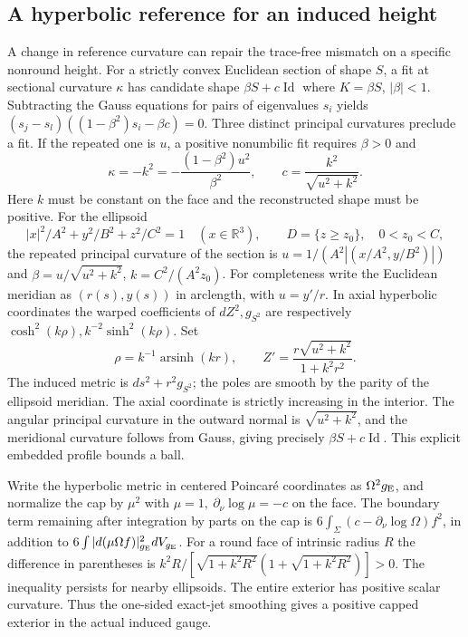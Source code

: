 \documentclass[11pt,letterpaper]{article}
\numberwithin{equation}{section}
\begin{document}
\subsection{A hyperbolic reference for an induced height}
A change in reference curvature can repair the trace-free mismatch
on a specific nonround height. For a strictly convex Euclidean
section of shape \(S\), a fit at sectional curvature \(\kappa\)
has candidate shape \(\beta S+c\operatorname{Id}\) where
\(K=\beta S\), \(|\beta|<1\). Subtracting the Gauss equations for
pairs of eigenvalues \(s_i\) yields
\((s_j-s_l)((1-\beta^2)s_i-\beta c)=0\).
Three distinct principal curvatures preclude a fit. If the repeated
one is \(u\), a positive nonumbilic fit requires \(\beta>0\) and
\[
 \kappa=-k^2=-\frac{(1-\beta^2)u^2}{\beta^2},\qquad
 c=\frac{k^2}{\sqrt{u^2+k^2}}.
\]
Here \(k\) must be constant on the face and the reconstructed shape
must be positive. For the ellipsoid
\[
 |x|^2/A^2+y^2/B^2+z^2/C^2=1\quad(x\in\mathbb R^3),
 \qquad D=\{z\ge z_0\},\quad 0<z_0<C,
\]
the repeated principal curvature of the section is
\(u=1/(A^2|(x/A^2,y/B^2)|)\) and
\(\beta=u/\sqrt{u^2+k^2}\), \(k=C^2/(A^2z_0)\).
For completeness write the Euclidean meridian as \((r(s),y(s))\)
in arclength, with \(u=y'/r\). In axial hyperbolic coordinates the
warped coefficients of \(dZ^2,g_{S^2}\) are respectively
\(\cosh^2(k\rho),k^{-2}\sinh^2(k\rho)\). Set
\[
 \rho=k^{-1}\operatorname{arsinh}(kr),\qquad
 Z'=\frac{r\sqrt{u^2+k^2}}{1+k^2r^2}.
\]
The induced metric is \(ds^2+r^2g_{S^2}\); the poles are smooth by
the parity of the ellipsoid meridian. The axial coordinate is strictly
increasing in the interior. The angular principal curvature in the
outward normal is \(\sqrt{u^2+k^2}\), and the meridional curvature
follows from Gauss, giving precisely \(\beta S+c\operatorname{Id}\).
This explicit embedded profile bounds a ball.

Write the hyperbolic metric in centered Poincar\'e coordinates as
\(\Omega^2g_{\rm E}\), and normalize the cap by \(\mu^2\) with
\(\mu=1,\ \partial_\nu\log\mu=-c\) on the face. The boundary
term remaining after integration by parts on the cap is
\(6\int_\Sigma(c-\partial_\nu\log\Omega)f^2\), in addition to
\(6\int |d(\mu\Omega f)|^2_{g_{\rm E}}dV_{g_{\rm E}}\).
For a round face of intrinsic radius \(R\) the difference in parentheses
is \(k^2R/[\sqrt{1+k^2R^2}(1+\sqrt{1+k^2R^2})]>0\).
The inequality persists for nearby ellipsoids. The entire exterior
has positive scalar curvature. Thus the one-sided exact-jet smoothing
gives a positive capped exterior in the actual induced gauge.
\end{document}
